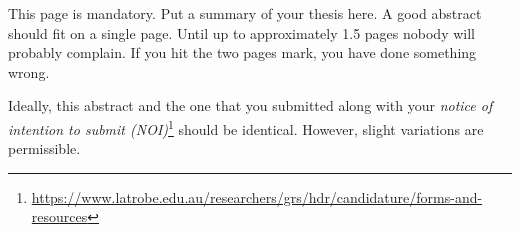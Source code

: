 This page is mandatory. Put a summary of your thesis here. A good abstract should fit on a single page. Until up to approximately 1.5 pages nobody will probably complain. If you hit the two pages mark, you have done something wrong.

Ideally, this abstract and the one that you submitted along with your \emph{notice of intention to submit (NOI)}\footnote{\url{https://www.latrobe.edu.au/researchers/grs/hdr/candidature/forms-and-resources}} should be identical. However, slight variations are permissible. 
